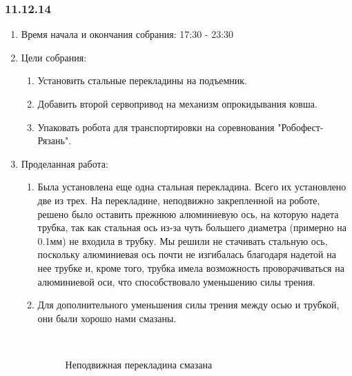 \subsubsection{11.12.14}

\begin{enumerate}
	\item Время начала и окончания собрания: 17:30 - 23:30
	\item Цели собрания:
	\begin{enumerate}
		\item Установить стальные перекладины на подъемник.
		
		\item Добавить второй сервопривод на механизм опрокидывания ковша.
		
		\item Упаковать робота для транспортировки на соревнования "Робофест-Рязань".
	\end{enumerate}
	\item Проделанная работа:
	\begin{enumerate}
		\item Была установлена еще одна стальная перекладина. Всего их установлено две из трех. На перекладине, неподвижно закрепленной на роботе, решено было оставить прежнюю алюминиевую ось, на которую надета трубка, так как стальная ось из-за чуть большего диаметра (примерно на 0.1мм) не входила в трубку. Мы решили не стачивать стальную ось, поскольку алюминиевая ось почти не изгибалась благодаря надетой на нее трубке и, кроме того, трубка имела возможность проворачиваться на алюминиевой оси, что способствовало уменьшению силы трения.
		
		\item Для дополнительного уменьшения силы трения между осью и трубкой, они были хорошо нами смазаны.
		
		\begin{figure}[H]
			\begin{minipage}[h]{0.2\linewidth}
				\center  
			\end{minipage}
			\begin{minipage}[h]{0.6\linewidth}
				\caption{Неподвижная перекладина смазана}
			\end{minipage}
		\end{figure}
		

\end{enumerate}
\end{enumerate}
